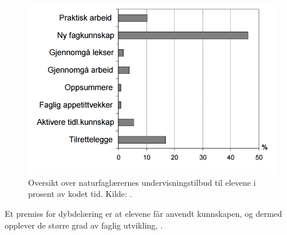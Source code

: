 \documentclass[main.tex]{subfiles}
\begin{document}
\begin{figure}[h!]
\includegraphics[scale = 0.6]{../figures/undervisnings_aktivitet.png}
\caption{Oversikt over naturfaglærernes undervisningstilbud til elevene i prosent av kodet tid. Kilde: \protect{}.}
\label{fig:odeg10}
\end{figure}







Et premiss for dybdelæring er at elevene får anvendt kunnskapen, og dermed opplever de større grad av faglig utvikling, .
\end{document}
